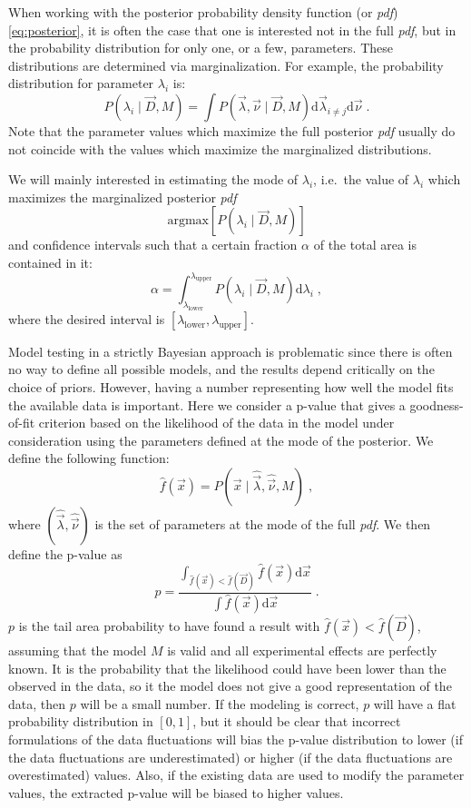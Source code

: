 When working with the posterior probability density function (or \emph{pdf}) \ref{eq:posterior}, it is often the case that one is interested not in the full \emph{pdf}, but in the probability distribution for only one, or a few, parameters. These distributions are determined via marginalization. For example, the probability distribution for parameter $\lambda_i$ is:
\[P(\lambda_i\mid\vec{D},M)=\int P(\vec{\lambda},\vec{\nu}\mid\vec{D},M)\text{d}\vec{\lambda}_{i\neq j}\text{d}\vec{\nu}\;.\]
Note that the parameter values which maximize the full posterior \emph{pdf} usually do not coincide with the values which maximize the marginalized distributions.

We will mainly interested in estimating the mode of $\lambda_i$, i.e.~the value of $\lambda_i$ which maximizes the marginalized posterior \emph{pdf}
\[\text{argmax}\left[ P(\lambda_i\mid\vec{D},M) \right]\]
and confidence intervals such that a certain fraction $\alpha$ of the total area is contained in it:
\[\alpha=\int^{\lambda_\text{upper}}_{\lambda_\text{lower}}P(\lambda_i\mid\vec{D},M)\text{d}\lambda_i\;,\]
where the desired interval is $[\lambda_\text{lower},\lambda_\text{upper}]$.

 Model testing in a strictly Bayesian approach is problematic since there is often no way to define all possible models, and the results depend critically on the choice of priors. However, having a number representing how well the model fits the available data is important. Here we consider a p-value that gives a goodness-of-fit criterion based on the likelihood of the data in the model under consideration using the parameters defined at the mode of the posterior. We define the following function:
\[\hat{f}(\vec{x})=P(\vec{x}\mid\hat{\vec{\lambda}},\hat{\vec{\nu}},M)\;,\]
where $(\hat{\vec{\lambda}},\hat{\vec{\nu}})$ is the set of parameters at the mode of the full \emph{pdf}. We then define the p-value as
\[p=\frac{\int_{\hat{f}(\vec{x})<\hat{f}(\vec{D})}\hat{f}(\vec{x})\text{d}\vec{x}}{\int \hat{f}(\vec{x})\text{d}\vec{x}}\;.\]
$p$ is the tail area probability to have found a result with $\hat{f}(\vec{x})<\hat{f}(\vec{D})$, assuming that the model $M$ is valid and all experimental effects are perfectly known. It is the probability that the likelihood could have been lower than the observed in the data, so it the model does not give a good representation of the data, then $p$ will be a small number. If the modeling is correct, $p$ will have a flat probability distribution in $[0,1]$, but it should be clear that incorrect formulations of the data fluctuations will bias the p-value distribution to lower (if the data fluctuations are underestimated) or higher (if the data fluctuations are overestimated) values. Also, if the existing data are used to modify the parameter values, the extracted p-value will be biased to higher values.

